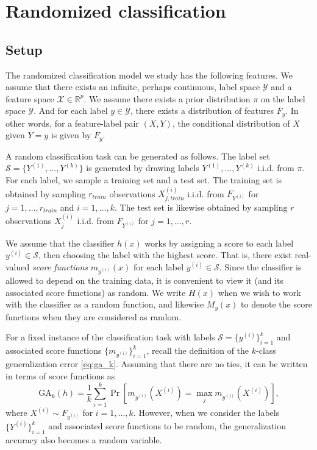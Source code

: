 \documentclass[12pt]{article}
\begin{document}
\section{Randomized classification}\label{sec:rc_motivation}


\subsection{Setup}

The randomized classification model we study has the following
features.  We assume that there exists an infinite, perhaps continuous, label space $\mathcal{Y}$ and a feature space $\mathcal{X} \in \mathbb{R}^p$.  
We assume there exists a prior distribution $\pi$ on the label space $\mathcal{Y}$.
And for each label $y \in \mathcal{Y}$,
there exists a distribution of features $F_y$. In other words, for a feature-label pair $(X, Y)$, the conditional distribution
of $X$ given $Y = y$ is given by $F_y$.  

A random classification task can be generated as follows.  The
label set $\mathcal{S} = \{Y^{(1)},\hdots, Y^{(k)}\}$ is generated by
drawing labels $Y^{(1)},\hdots, Y^{(k)}$ i.i.d. from $\pi$.  
For each label, we sample a training set and a
test set.  The training set is obtained by sampling $r_{train}$ observations
$X_{j, train}^{(i)}$ i.i.d. from $F_{Y^{(i)}}$ for $j = 1,\hdots,
r_{train}$ and $i = 1,\hdots, k$.  The test set is likewise obtained by sampling $r$
observations $X_j^{(i)}$ i.i.d. from $F_{Y^{(i)}}$ for $j = 1,\hdots,
r$.  

We assume that the classifier $h(x)$ works by assigning a score to each label $y^{(i)} \in \mathcal{S}$, then choosing the label with the highest score.  That is, there exist real-valued \emph{score functions} $m_{y^{(i)}}(x)$ for each label $y^{(i)} \in \mathcal{S}$.
Since the classifier is allowed to depend on the training data, it is convenient to view it (and its associated score functions) as random.  We write $H(x)$ when we wish to work with the classifier as a random function, and likewise $M_y(x)$ to denote the score functions when they are considered as random.

For a fixed instance of the classification task with labels $\mathcal{S} = \{y^{(i)}\}_{i=1}^k$ and associated score functions $\{m_{y^{(i)}}\}_{i=1}^k$, recall the definition of the $k$-class generalization error \eqref{eq:ga_k}.  Assuming that there are no ties, it can be written in terms of score functions as
\[
\text{GA}_k(h) = \frac{1}{k} \sum_{i=1}^k  \Pr[m_{y^{(i)}}(X^{(i)}) = \max_j
m_{y^{(j)}}(X^{(i)})],
\]
where $X^{(i)} \sim F_{y^{(i)}}$ for $i =1,\hdots, k$.
However, when we consider the labels $\{Y^{(i)}\}_{i=1}^k$ and associated score functions to be random, the generalization accuracy also becomes a random variable.
\end{document}
